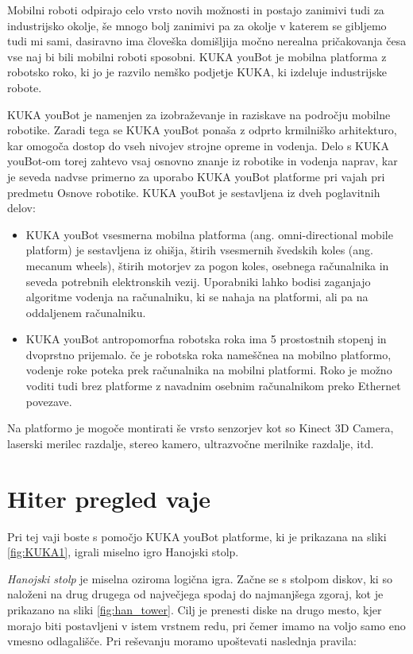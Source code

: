Mobilni roboti odpirajo celo vrsto novih možnosti in postajo zanimivi tudi za industrijsko okolje, še mnogo bolj zanimivi pa za okolje v katerem se gibljemo tudi mi sami, dasiravno ima človeška domišljija močno nerealna pričakovanja česa vse naj bi bili mobilni roboti sposobni.
KUKA youBot je mobilna platforma z robotsko roko, ki jo je razvilo nemško podjetje KUKA, ki izdeluje industrijske robote.

KUKA youBot je namenjen za izobraževanje in raziskave na področju mobilne robotike. Zaradi tega se KUKA youBot ponaša z odprto krmilniško arhitekturo, kar omogoča dostop do vseh nivojev strojne opreme in vodenja. Delo s KUKA youBot-om torej zahtevo vsaj osnovno znanje iz robotike in vodenja naprav, kar je seveda nadvse primerno za uporabo KUKA youBot platforme pri vajah pri predmetu Osnove robotike.
KUKA youBot je sestavljena iz dveh poglavitnih delov:
\begin{itemize}
\item KUKA youBot vsesmerna mobilna platforma (ang. omni-directional mobile platform) je sestavljena iz ohišja, štirih vsesmernih švedskih koles (ang. mecanum wheels), štirih motorjev za pogon koles, osebnega računalnika in seveda potrebnih elektronskih vezij. Uporabniki lahko bodisi zaganjajo algoritme vodenja na računalniku, ki se nahaja na platformi, ali pa na oddaljenem računalniku.
\item KUKA youBot antropomorfna robotska roka ima 5 prostostnih stopenj in dvoprstno prijemalo. če je robotska roka nameščnea na mobilno platformo, vodenje roke poteka prek računalnika na mobilni platformi. Roko je možno voditi tudi brez platforme z navadnim osebnim računalnikom preko Ethernet povezave.
\end{itemize}

Na platformo je mogoče montirati še vrsto senzorjev kot so Kinect 3D Camera, laserski merilec razdalje, stereo kamero, ultrazvočne merilnike razdalje, itd.

\section{Hiter pregled vaje}

Pri tej vaji boste s pomočjo KUKA youBot platforme, ki je prikazana na sliki \ref{fig:KUKA1}, igrali miselno igro Hanojski stolp.

\emph{Hanojski stolp} je miselna oziroma logična igra. Začne se s stolpom diskov, ki so naloženi na drug drugega od največjega spodaj do najmanjšega zgoraj, kot je prikazano na sliki \ref{fig:han_tower}. Cilj je prenesti diske na drugo mesto, kjer morajo biti postavljeni v istem vrstnem redu, pri čemer imamo na voljo samo eno vmesno odlagališče. Pri reševanju moramo upoštevati naslednja pravila:

